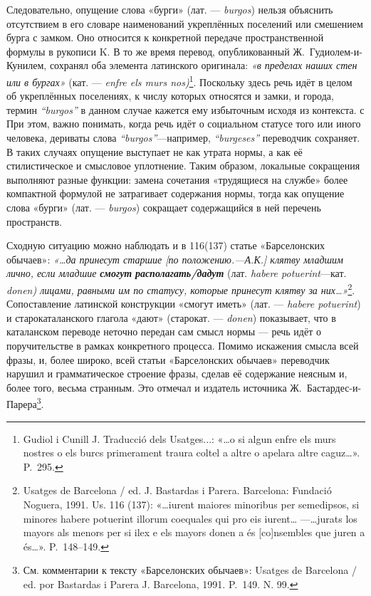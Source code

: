 Следовательно, опущение слова «бурги» (лат. --- \emph{burgos}) нельзя объяснить отсутствием в его словаре наименований укреплённых поселений или смешением бурга с замком. Оно относится к конкретной передаче пространственной формулы в рукописи K. В то же время перевод, опубликованный Ж.~Гудиолем-и-Кунилем, сохранял оба элемента латинского оригинала:\emph{ «в пределах наших стен или в бургах»} (кат. --- \emph{enfre els murs nos}\emph{)}\footnote{Gudiol i Cunill J. Traducció dels Usatges...: «…o si algun enfre els murs nostres o els burcs primerament traura coltel a altre o apelara altre caguz…». P.~295.}. Поскольку здесь речь идёт в целом об укреплённых поселениях, к числу которых относятся и замки, и города, термин \emph{“burgos”}\emph{ }в данном случае кажется ему избыточным исходя из контекста. с При этом, важно понимать, когда речь идёт о социальном статусе того или иного человека, дериваты слова \emph{“burgos”}---например, \emph{“burgeses” }переводчик сохраняет. В таких случаях опущение выступает не как утрата нормы, а как её стилистическое и смысловое уплотнение. Таким образом, локальные сокращения выполняют разные функции: замена сочетания «трудящиеся на службе» более компактной формулой не затрагивает содержания нормы, тогда как опущение слова «бурги» (лат. --- \emph{burgos}) сокращает содержащийся в ней перечень пространств.

Сходную ситуацию можно наблюдать и в 116(137) статье «Барселонских обычаев»: \emph{«…да принесут старшие [по положению.---А.К.] клятву младшим лично, если младшие }\textbf{\emph{смогут }}\textbf{\emph{располагать/дадут}}\emph{ }(лат. \emph{habere potuerint}---кат. \emph{donen) лицами, равными им по статусу, которые принесут клятву за них…»}\footnote{Usatges de Barcelona / ed. J. Bastardas i Parera. Barcelona: Fundació Noguera, 1991. Us. 116 (137): «…iurent maiores minoribus per semedipsos, si minores habere potuerint illorum coequales qui pro eis iurent… ---…jurats los mayors als menors per si ilex e els mayors donen a és [co]nsembles que juren a és…». P.~148--149.}. Сопоставление латинской конструкции «смогут иметь» (лат. --- \emph{habere potuerint}) и старокаталанского глагола «дают» (старокат. --- \emph{donen}) показывает, что в каталанском переводе неточно передан сам смысл нормы --- речь идёт о поручительстве в рамках конкретного процесса. Помимо искажения смысла всей фразы, и, более широко, всей статьи «Барселонских обычаев» переводчик нарушил и грамматическое строение фразы, сделав её содержание неясным и, более того, весьма странным. Это отмечал и издатель источника Ж.~Бастардес-и-Парера\footnote{См. комментарии к тексту «Барселонских обычаев»: Usatges de Barcelona / ed. por Bastardas i Parera J. Barcelona, 1991. P.~149. N. 99.}.

